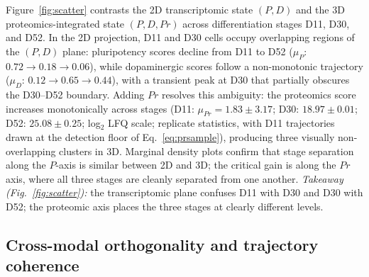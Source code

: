 \documentclass[5p,times,twocolumn]{elsarticle}
\newcommand{\rtag}[1]{}
\newcommand{\rev}[2]{\rtag{#1}#2}
\begin{document}
Figure~\ref{fig:scatter} contrasts the 2D transcriptomic state
$(P, D)$ and the 3D proteomics-integrated state $(P, D, Pr)$
across differentiation stages D11, D30, and D52.
In the 2D projection, D11 and D30 cells occupy overlapping
regions of the $(P, D)$ plane: pluripotency scores decline
from D11 to D52 ($\mu_{P}$: $0.72 \to 0.18 \to 0.06$),
while dopaminergic scores follow a non-monotonic trajectory
($\mu_{D}$: $0.12 \to 0.65 \to 0.44$), with a transient
peak at D30 that partially obscures the D30--D52 boundary.
Adding $Pr$ resolves this ambiguity: the proteomics score
increases monotonically across stages
(D11: $\mu_{Pr} = 1.83 \pm 3.17$;
D30: $18.97 \pm 0.01$;
D52: $25.08 \pm 0.25$; log$_{2}$ LFQ scale\rev{AC}{; replicate
  statistics, with D11 trajectories drawn at the detection floor
  of Eq.~\eqref{eq:prsample}}),
producing three visually non-overlapping clusters in 3D.
Marginal density plots confirm that stage separation along the
$P$-axis is similar between 2D and 3D; the critical gain is
along the $Pr$ axis, where all three stages are cleanly
separated from one another.
\rev{R1.13}{\textit{Takeaway (Fig.~\ref{fig:scatter}):} the
  transcriptomic plane confuses D11 with D30 and D30 with D52;
  the proteomic axis places the three stages at clearly different
  levels.}

\subsection{\textbf{Cross-modal orthogonality and trajectory
    coherence}}
\label{sec:res_orthog}


\begin{table}[!htbp]
  \caption{%
    Cross-modal Spearman correlations among $(P, D, Pr)$ per stage
    with bootstrap 95\% CIs ($n = 1{,}000$ resamples).
    All $Pr$ correlations have CIs straddling zero.}
  \label{tab:correlations}
  \centering
\end{table}
\end{document}
